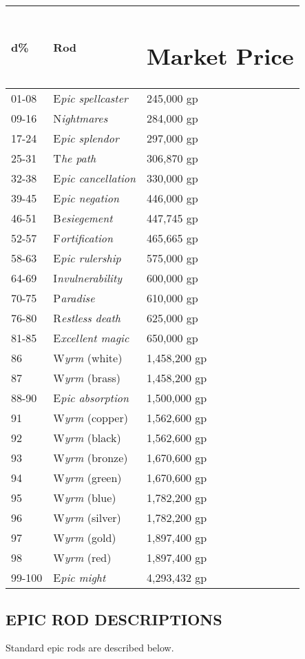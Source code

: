 \documentclass{article}
\begin{document}
\begin{tabular}{|>{\raggedright}p{30pt}|>{\raggedright}p{212pt}|>{\raggedright}p{71pt}|}
\hline
d\textbf{\%} & R\textbf{od } & \section*{M\textbf{arket Price }}\tabularnewline
\hline
01-08 & E\textit{pic spellcaster } & 245,000 gp \tabularnewline
\hline
09-16 & N\textit{ightmares } & 284,000 gp \tabularnewline
\hline
17-24 & E\textit{pic splendor } & 297,000 gp \tabularnewline
\hline
25-31 & T\textit{he path } & 306,870 gp \tabularnewline
\hline
32-38 & E\textit{pic cancellation } & 330,000 gp \tabularnewline
\hline
39-45 & E\textit{pic negation } & 446,000 gp \tabularnewline
\hline
46-51 & B\textit{esiegement } & 447,745 gp \tabularnewline
\hline
52-57 & F\textit{ortification } & 465,665 gp \tabularnewline
\hline
58-63 & E\textit{pic rulership } & 575,000 gp \tabularnewline
\hline
64-69 & I\textit{nvulnerability} & 600,000 gp \tabularnewline
\hline
70-75 & P\textit{aradise } & 610,000 gp \tabularnewline
\hline
76-80 & R\textit{estless death } & 625,000 gp \tabularnewline
\hline
81-85 & E\textit{xcellent magic } & 650,000 gp \tabularnewline
\hline
86 & W\textit{yrm }(white)  & 1,458,200 gp \tabularnewline
\hline
87 & W\textit{yrm }(brass)  & 1,458,200 gp \tabularnewline
\hline
88-90 & E\textit{pic absorption } & 1,500,000 gp \tabularnewline
\hline
91 & W\textit{yrm }(copper)  & 1,562,600 gp \tabularnewline
\hline
92 & W\textit{yrm }(black)  & 1,562,600 gp \tabularnewline
\hline
93 & W\textit{yrm }(bronze)  & 1,670,600 gp \tabularnewline
\hline
94 & W\textit{yrm }(green)  & 1,670,600 gp \tabularnewline
\hline
95 & W\textit{yrm }(blue)  & 1,782,200 gp \tabularnewline
\hline
96 & W\textit{yrm }(silver)  & 1,782,200 gp \tabularnewline
\hline
97 & W\textit{yrm }(gold)  & 1,897,400 gp \tabularnewline
\hline
98 & W\textit{yrm }(red)  & 1,897,400 gp \tabularnewline
\hline
99-100 & E\textit{pic might } & 4,293,432 gp \tabularnewline
\hline
\end{tabular}

\vspace{12pt}
\subsection*{EPIC ROD DESCRIPTIONS }

Standard epic rods are described below. 
\end{document}

